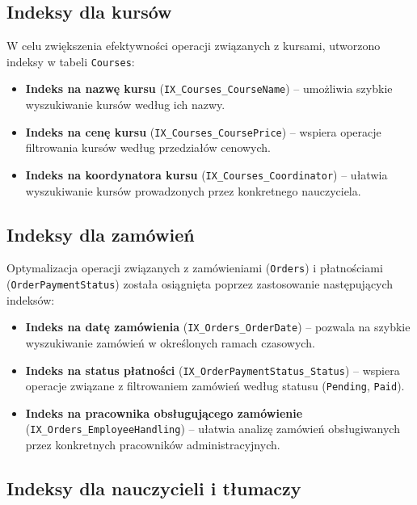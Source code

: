 \documentclass[12pt]{article}
\begin{document}
\subsection{Indeksy dla kursów}

\noindent W celu zwiększenia efektywności operacji związanych z kursami, utworzono indeksy w tabeli \texttt{Courses}:

\begin{itemize}
    \item \textbf{Indeks na nazwę kursu} (\texttt{IX\_Courses\_CourseName}) -- umożliwia szybkie wyszukiwanie kursów według ich nazwy.
    \item \textbf{Indeks na cenę kursu} (\texttt{IX\_Courses\_CoursePrice}) -- wspiera operacje filtrowania kursów według przedziałów cenowych.
    \item \textbf{Indeks na koordynatora kursu} (\texttt{IX\_Courses\_Coordinator}) -- ułatwia wyszukiwanie kursów prowadzonych przez konkretnego nauczyciela.
\end{itemize}

\subsection{Indeksy dla zamówień}

\noindent Optymalizacja operacji związanych z zamówieniami (\texttt{Orders}) i płatnościami (\texttt{OrderPaymentStatus}) została osiągnięta poprzez zastosowanie następujących indeksów:

\begin{itemize}
    \item \textbf{Indeks na datę zamówienia} (\texttt{IX\_Orders\_OrderDate}) -- pozwala na szybkie wyszukiwanie zamówień w określonych ramach czasowych.
    \item \textbf{Indeks na status płatności} (\texttt{IX\_OrderPaymentStatus\_Status}) -- wspiera operacje związane z filtrowaniem zamówień według statusu (\texttt{Pending}, \texttt{Paid}).
    \item \textbf{Indeks na pracownika obsługującego zamówienie} (\texttt{IX\_Orders\_EmployeeHandling}) -- ułatwia analizę zamówień obsługiwanych przez konkretnych pracowników administracyjnych.
\end{itemize}

\subsection{Indeksy dla nauczycieli i tłumaczy}
\end{document}
